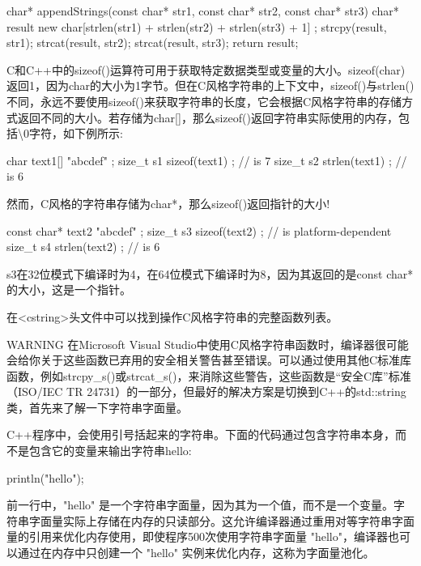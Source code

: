 \begin{cpp}
char* appendStrings(const char* str1, const char* str2, const char* str3)
{
    char* result { new char[strlen(str1) + strlen(str2) + strlen(str3) + 1] };
    strcpy(result, str1);
    strcat(result, str2);
    strcat(result, str3);
    return result;
}
\end{cpp}

C和C++中的sizeof()运算符可用于获取特定数据类型或变量的大小。sizeof(char)返回1，因为char的大小为1字节。但在C风格字符串的上下文中，sizeof()与strlen()不同，永远不要使用sizeof()来获取字符串的长度，它会根据C风格字符串的存储方式返回不同的大小。若存储为char[]，那么sizeof()返回字符串实际使用的内存，包括\textbackslash{}0字符，如下例所示:

\begin{cpp}
char text1[] { "abcdef" };
size_t s1 { sizeof(text1) }; // is 7
size_t s2 { strlen(text1) }; // is 6
\end{cpp}

然而，C风格的字符串存储为char*，那么sizeof()返回指针的大小!

\begin{cpp}
const char* text2 { "abcdef" };
size_t s3 { sizeof(text2) }; // is platform-dependent
size_t s4 { strlen(text2) }; // is 6
\end{cpp}

s3在32位模式下编译时为4，在64位模式下编译时为8，因为其返回的是const char*的大小，这是一个指针。

在<cstring>头文件中可以找到操作C风格字符串的完整函数列表。

\begin{myWarning}{WARNING}
在Microsoft Visual Studio中使用C风格字符串函数时，编译器很可能会给你关于这些函数已弃用的安全相关警告甚至错误。可以通过使用其他C标准库函数，例如strcpy\_s()或strcat\_s()，来消除这些警告，这些函数是“安全C库”标准（ISO/IEC TR 24731）的一部分，但最好的解决方案是切换到C++的std::string类，首先来了解一下字符串字面量。
\end{myWarning}


C++程序中，会使用引号括起来的字符串。下面的代码通过包含字符串本身，而不是包含它的变量来输出字符串hello:

\begin{cpp}
println("hello");
\end{cpp}

前一行中，"hello" 是一个字符串字面量，因为其为一个值，而不是一个变量。字符串字面量实际上存储在内存的只读部分。这允许编译器通过重用对等字符串字面量的引用来优化内存使用，即使程序500次使用字符串字面量 "hello"，编译器也可以通过在内存中只创建一个 "hello" 实例来优化内存，这称为字面量池化。


